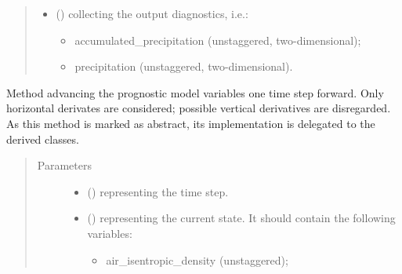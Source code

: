 \documentclass[letterpaper,10pt,english]{sphinxmanual}
\begin{document}
\begin{fulllineitems}
\begin{fulllineitems}
\begin{quote}
\begin{description}
\begin{itemize}
\begin{itemize}
\end{itemize}

\item {} 
 () \textendash{} {\hyperref[\detokenize{api:tasmania.storages.grid_data.GridData}]{}} collecting the output diagnostics, i.e.:
\begin{itemize}
\item {} 
accumulated\_precipitation (unstaggered, two-dimensional);

\item {} 
precipitation (unstaggered, two-dimensional).

\end{itemize}

\end{itemize}


\end{description}\end{quote}

\end{fulllineitems}


\begin{fulllineitems}
\label{\detokenize{api:tasmania.dycore.prognostic_isentropic_nonconservative.PrognosticIsentropicNonconservative.step_neglecting_vertical_advection}}
Method advancing the prognostic model variables one time step forward.
Only horizontal derivates are considered; possible vertical derivatives are disregarded.
As this method is marked as abstract, its implementation is delegated to the derived classes.
\begin{quote}\begin{description}
\item[{Parameters}] \leavevmode\begin{itemize}
\item {} 
 () \textendash{}  representing the time step.

\item {} 
 () \textendash{} 
{\hyperref[\detokenize{api:tasmania.storages.state_isentropic.StateIsentropic}]{}} representing the current state.
It should contain the following variables:
\begin{itemize}
\item {} 
air\_isentropic\_density (unstaggered);


\end{itemize}
\end{itemize}
\end{description}
\end{quote}
\end{fulllineitems}
\end{fulllineitems}
\end{document}
